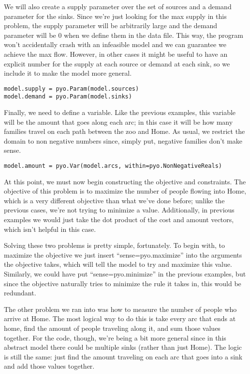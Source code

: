 \documentclass{article}
\begin{document}
We will also create a supply parameter over the set of sources and a demand parameter for the sinks.  Since we're just looking for the max supply in this problem, the supply parameter will be arbitrarily large and the demand parameter will be $0$ when we define them in the data file.  This way, the program won't accidentally crash with an infeasible model and we can guarantee we achieve the max flow.  However, in other cases it might be useful to have an explicit number for the supply at each source or demand at each sink, so we include it to make the model more general.

\begin{verbatim}
model.supply = pyo.Param(model.sources)
model.demand = pyo.Param(model.sinks)
\end{verbatim}

Finally, we need to define a variable.  Like the previous examples, this variable will be the amount that goes along each arc; in this case it will be how many families travel on each path between the zoo and Home.  As usual, we restrict the domain to non negative numbers since, simply put, negative families don't make sense.  

\begin{verbatim}
model.amount = pyo.Var(model.arcs, within=pyo.NonNegativeReals)
\end{verbatim}

At this point, we must now begin constructing the objective and constraints.  The objective of this problem is to maximize the number of people flowing into Home, which is a very different objective than what we've done before; unlike the previous cases, we're not trying to minimize a value.  Additionally, in previous examples we would just take the dot product of the cost and amount vectors, which isn't helpful in this case.

Solving these two problems is pretty simple, fortunately.  To begin with, to maximize the objective we just insert ``sense=pyo.maximize'' into the arguments the objective takes, which will tell the model to try and maximize this value.  Similarly, we could have put ``sense=pyo.minimize'' in the previous examples, but since the objective naturally tries to minimize the rule it takes in, this would be redundant.

The other problem we ran into was how to measure the number of people who arrive at Home.  The most logical way to do this is take every arc that ends at home, find the amount of people traveling along it, and sum those values together.  For the code, though, we're being a bit more general since in this abstract model there could be multiple sinks (rather than just Home).  The logic is still the same: just find the amount traveling on each arc that goes into a sink and add those values together.
\end{document}
